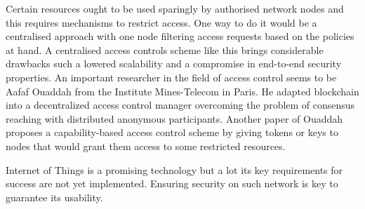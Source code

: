 \documentclass[14]{article}
\begin{document}
Certain resources ought to be used sparingly by authorised network nodes and this requires mechanisms to restrict access. One way to do it would be a centralised approach\cite{hernandez2013distributed} with one node filtering access requests based on the policies at hand. A centralised access controls scheme like this brings considerable drawbacks\cite{ouaddah2017towards} such a lowered scalability and a compromise in end-to-end security properties. An important researcher in the field of access control seems to be Aafaf Ouaddah from the Institute Mines-Telecom in Paris. He adapted blockchain\cite{ouaddah2016fairaccess} into a decentralized access control manager overcoming the problem of consensus reaching with distributed anonymous participants. Another paper\cite{ouaddah2017access} of Ouaddah proposes a capability-based access control scheme by giving tokens or keys to nodes that would grant them access to some restricted resources. 
\newline


Internet of Things is a promising technology but a lot its key requirements for success are not yet implemented\cite{borgia2014internet}. Ensuring security on such network is key to guarantee its usability. 


	
\end{document}
